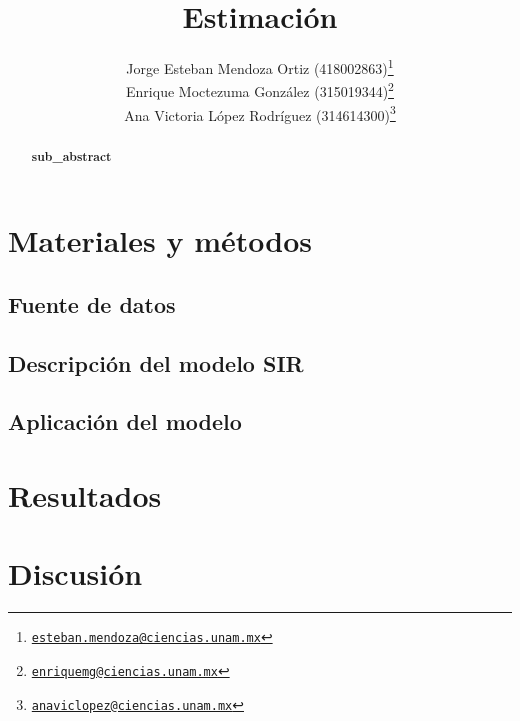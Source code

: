 \documentclass[12pt]{article}
\newcommand{\absdiv}[1]{%
  \par\addvspace{.5\baselineskip}%
  \noindent\textbf{#1}\quad\ignorespaces
}
\begin{document}
	\title{Estimación}
	\author{Jorge Esteban Mendoza Ortiz (418002863)\thanks{\href{mailto:esteban.mendoza@ciencias.unam.mx}{\nolinkurl{esteban.mendoza@ciencias.unam.mx}}} \\
	Enrique Moctezuma González (315019344)\thanks{\href{mailto:enriquemg@ciencias.unam.mx}{\nolinkurl{enriquemg@ciencias.unam.mx}}}\\
	Ana Victoria López Rodríguez (314614300)\thanks{\href{anaviclopez@ciencias.unam.mx}{\nolinkurl{anaviclopez@ciencias.unam.mx}}}}
	\date{}
	\maketitle
	
	\begin{abstract}
	\absdiv{sub\_abstract}
	\end{abstract}
	
	\noindent
	
	\section{Materiales y métodos}
	\subsection*{Fuente de datos}
	
	\subsection*{Descripción del modelo SIR}
	
	\subsection*{Aplicación del modelo}
	
	\section{Resultados}
	
	\section{Discusión}
	
	
	
\end{document}

